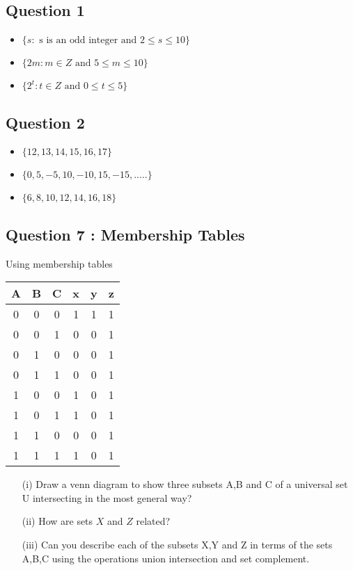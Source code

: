 \subsection*{Question 1}

\begin{itemize}
\item $\{ s :  \mbox{ s is an odd integer and } 2 \leq s \leq 10 \}$
\item $\{ 2m :  m \in Z \mbox{ and }5 \leq m \leq 10 \}$
\item $\{ 2^t :  t \in Z \mbox{ and } 0 \leq t \leq 5 \}$
\end{itemize}

\subsection*{Question 2}

\begin{itemize}
\item $\{12,13,14,15,16,17\}$
\item $\{0,5,-5,10,-10,15,-15,.....\}$
\item $\{6,8,10,12,14,16,18\}$
\end{itemize}

\subsection*{Question 7 : Membership Tables}
Using membership tables
\begin{tabular}{|ccc|c|c|c|}
\hline
A & B & C & x & y & z \\\hline
0 & 0 & 0 & 1 & 1 & 1 \\
0 & 0 & 1 & 0 & 0 & 1 \\
0 & 1 & 0 & 0 & 0 & 1 \\
0 & 1 & 1 & 0 & 0 & 1 \\
1 & 0 & 0 & 1 & 0 & 1 \\
1 & 0 & 1 & 1 & 0 & 1 \\
1 & 1 & 0 & 0 & 0 & 1 \\
1 & 1 & 1 & 1 & 0 & 1 \\
\hline
\end{tabular}
\begin{itemize}
\item[(i)] Draw a venn diagram to show three subsets A,B and C of a universal set U intersecting in
the most general way?
\item[(ii)] How are sets $X$ and $Z$ related?
\item[(iii)] Can you describe each of the subsets X,Y and Z in terms  of the
sets A,B,C using the operations union intersection and set complement.
\end{itemize}

